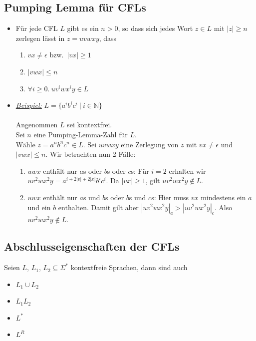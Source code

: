 \documentclass[ieeetran]{article}
\begin{document}
\subsection{Pumping Lemma für CFLs} %
\label{sub:pumping_lemma_für_cFL}
\begin{itemize}
  \item Für jede CFL $L$ gibt es ein $n > 0$, so dass sich jedes Wort $z \in L$ mit $|z| \ge n$ zerlegen lässt in $z = uvwxy$, dass
	  \begin{enumerate}
	    \item $vx \neq \epsilon$ bzw.\ $|vx| \ge 1$
	\item $|vwx| \le n$
	\item $\forall i \ge 0. \ uv^iwx^iy \in L$
	  \end{enumerate}

  \item \textit{\underline{Beispiel:}} $L = \{a^ib^ic^i \ | \ i \in \mathbb{N} \}$
\\\\Angenommen $L$ sei kontextfrei.
\\Sei $n$ eine Pumping-Lemma-Zahl für $L$.
\\Wähle $z = a^nb^nc^n \in L$. Sei $uvwxy$ eine Zerlegung von $z$ mit $vx \neq \epsilon$ und $|vwx| \le n$. Wir betrachten nun 2 Fälle:
\begin{enumerate}
\item $uwx$ enthält nur $a$s oder $b$s oder $c$s: Für $i = 2$ erhalten wir $uv^2wx^2y = a^{i + 2|v| + 2|x|}b^ic^i$. Da $|vx| \ge 1$, gilt $uv^2wx^2y \not\in L$.
\item $uwx$ enthält nur $a$s und $b$s oder $b$s und $c$s: Hier muss $vx$ mindestens ein $a$ und ein $b$ enthalten. Damit gilt aber $|uv^2wx^2y|_a > |uv^2wx^2y|_c$. Also $uv^2wx^2y \not\in L$.
\end{enumerate}


\end{itemize}


\subsection{Abschlusseigenschaften der CFLs} %
\label{sub:abschlusseigenschaften_der_cFLs}
Seien $L$, $L_1$, $L_2 \subseteq \Sigma^*$ kontextfreie Sprachen, dann sind auch
\begin{itemize}
  \item $L_1 \cup L_2$
\item $L_1L_2$
\item $L^*$
\item $L^R$
\end{itemize}
\end{document}
